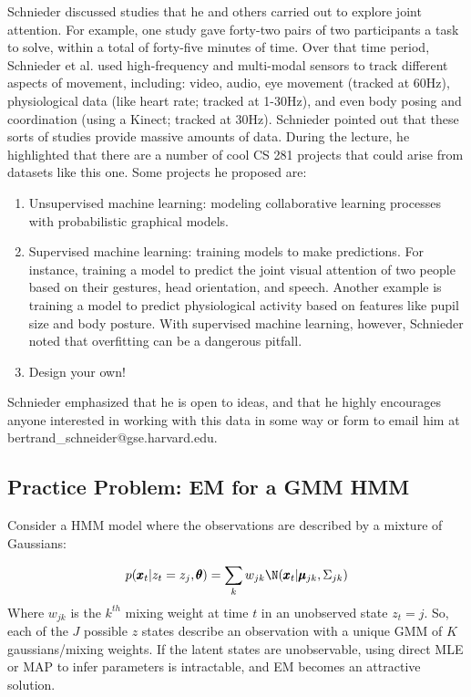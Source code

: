 \documentclass{article}
\begin{document}
Schnieder discussed studies that he and others carried out to explore joint attention. For example, one study gave forty-two pairs of two participants a task to solve, within a total of forty-five minutes of time. Over that time period, Schnieder et al. used high-frequency and multi-modal sensors to track different aspects of movement, including: video, audio, eye movement (tracked at 60Hz), physiological data (like heart rate; tracked at 1-30Hz), and even body posing and coordination (using a Kinect; tracked at 30Hz). Schnieder pointed out that these sorts of studies provide massive amounts of data. During the lecture, he highlighted that there are a number of cool CS 281 projects that could arise from datasets like this one. Some projects he proposed are:
\begin{enumerate}

\item Unsupervised machine learning: modeling collaborative learning processes with probabilistic graphical models.
\item Supervised machine learning: training models to make predictions. For instance, training a model to predict the joint visual attention of two people based on their gestures, head orientation, and speech. Another example is training a model to predict physiological activity based on features like pupil size and body posture. With supervised machine learning, however, Schnieder noted that overfitting can be a dangerous pitfall.
\item Design your own!

\end{enumerate}

Schnieder emphasized that he is open to ideas, and that he highly encourages anyone interested in working with this data in some way or form to email him at bertrand\_schneider@gse.harvard.edu.

\subsection{Practice Problem: EM for a GMM HMM}
Consider a HMM model where the observations are described by a mixture of Gaussians: 

$$p(\pmb{x}_t | z_t = z_j, \pmb{\theta}) = \sum_k w_{jk} \N (\pmb{x}_t | \pmb{\mu}_{jk}, \Sigma_{jk})$$
Where $w_{jk}$ is the $k^{th}$ mixing weight at time $t$ in an unobserved state $z_t = j$. So, each of the $J$ possible $z$ states describe an observation with a unique GMM of $K$ gaussians/mixing weights. If the latent states are unobservable, using direct MLE or MAP to infer parameters is intractable, and EM becomes an attractive solution.  
\end{document}
